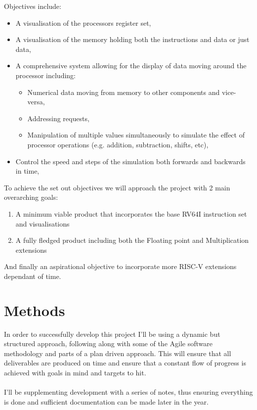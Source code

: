 \documentclass[a4paper,fleqn,12pt]{article}
\begin{document}
Objectives include:
\begin{itemize}
    \item A visualisation of the processors register set,
    \item A visualisation of the memory holding both the instructions and data or just data,
    \item A comprehensive system allowing for the display of data moving around the processor including:
    \begin{itemize}
        \item Numerical data moving from memory to other components and vice-versa,
        \item Addressing requests,
        \item Manipulation of multiple values simultaneously to simulate the effect of processor operations (e.g. addition, subtraction, shifts, etc),
    \end{itemize}
    \item Control the speed and steps of the simulation both forwards and backwards in time,
\end{itemize}

To achieve the set out objectives we will approach the project with 2 main overarching goals:
\begin{enumerate}
    \item A minimum viable product that incorporates the base RV64I instruction set and visualisations
    \item A fully fledged product including both the Floating point and Multiplication extensions
\end{enumerate}

And finally an aspirational objective to incorporate more RISC-V extensions dependant of time.


\section{Methods}
In order to successfully develop this project I'll be using a dynamic but structured approach, following along with some of the Agile software methodology and parts of a plan driven approach. This will ensure that all deliverables are produced on time and ensure that a constant flow of progress is achieved with goals in mind and targets to hit.
\\\\
I'll be supplementing development with a series of notes, thus ensuring everything is done and sufficient documentation can be made later in the year.
\end{document}
